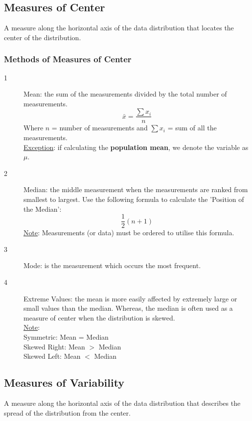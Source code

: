 \documentclass[12pt, letterpaper]{article}
\begin{document}
        \subsection{Measures of Center}
            A measure along the horizontal axis of the data distribution that locates the center of the distribution.
            \subsubsection{Methods of Measures of Center}
                \begin{description}
                    \item[1] Mean: the sum of the measurements divided by the total number of measurements. \smallskip 
                        \begin{equation}
                            \bar{x} = \frac{\sum x_i}{n}
                        \end{equation}
                        Where $n$ = number of measurements and $\sum x_i$ = sum of all the measurements. \\ \underline{Exception}: if calculating the \textbf{population mean}, we denote the variable as $\mu$.
                    \item[2] Median: the middle measurement when the measurements are ranked from smallest to largest. Use the following formula to calculate the 'Position of the Median': \smallskip
                        \begin{equation}
                            \frac{1}{2}(n + 1)
                        \end{equation}
                        \underline{Note}: Measurements (or data) must be ordered to utilise this formula.
                    \item[3] Mode: is the measurement which occurs the most frequent.
                    \item[4] Extreme Values: the mean is more easily affected by extremely large or small values than the median. Whereas, the median is often used as a measure of center when the distribution is skewed. \\ \underline{Note}: \\ Symmetric: Mean = Median \\ Skewed Right: Mean $>$ Median \\ Skewed Left: Mean $<$ Median 
                \end{description}
        
        \subsection{Measures of Variability}
            A measure along the horizontal axis of the data distribution that describes the spread of the distribution from the center.
\end{document}
